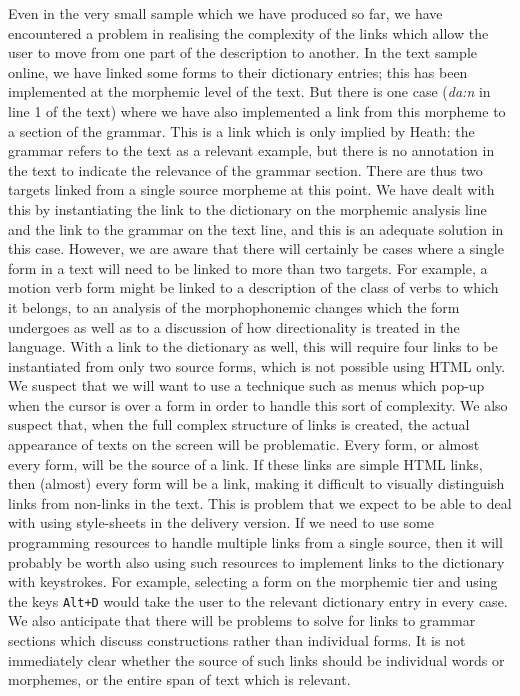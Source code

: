 Even in the very small sample which we have produced so far, we have encountered a problem in realising the complexity of the links which allow the user to move from one part of the description to another. In the text sample online, we have linked some forms to their dictionary entries; this has been implemented at the morphemic level of the text. But there is one case (\textit{da:n} in line 1 of the text) where we have also implemented a link from this morpheme to a section of the grammar. This is a link which is only implied by Heath: the grammar refers to the text as a relevant example, but there is no annotation in the text to indicate the relevance of the grammar section. There are thus two targets linked from a single source morpheme at this point. We have dealt with this by instantiating the link to the dictionary on the morphemic analysis line and the link to the grammar on the text line, and this is an adequate solution in this case. However, we are aware that there will certainly be cases where a single form in a text will need to be linked to more than two targets. For example, a motion verb form might be linked to a description of the class of verbs to which it belongs, to an analysis of the morphophonemic changes which the form undergoes as well as to a discussion of how directionality is treated in the language. With a link to the dictionary as well, this will require four links to be instantiated from only two source forms, which is not possible using HTML only. We suspect that we will want to use a technique such as menus which pop-up when the cursor is over a form in order to handle this sort of complexity. We also suspect that, when the full complex structure of links is created, the actual appearance of texts on the screen will be problematic. Every form, or almost every form, will be the source of a link. 
If these links are simple HTML links, then (almost) every form will
be a link, making it difficult to visually distinguish links from
non-links in the text. This is  problem that we expect to be able to
deal with using style-sheets in the delivery version. If we need to use some programming resources to handle multiple links from a single source, then it will probably be worth also using such resources to implement links to the dictionary with keystrokes. For example, selecting a form on the morphemic tier and using the keys \texttt{Alt+D} would take the user to the relevant dictionary entry in every case. We also anticipate that there will be problems to solve for links to grammar sections which discuss constructions rather than individual forms. It is not immediately clear whether the source of such links should be individual words or morphemes, or the entire span of text which is relevant. 

